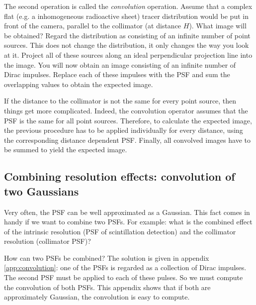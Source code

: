 \documentclass[11pt,oneside]{article}
\begin{document}
The second operation is called the {\em convolution} operation. Assume that a
complex flat (e.g. a inhomogeneous radioactive sheet) tracer distribution
would be put in front of the camera, parallel to the collimator (at distance
$H$). What image will be obtained?  Regard the distribution as consisting of
an infinite number of point sources. This does not change the distribution, it
only changes the way you look at it. Project all of these sources along an
ideal perpendicular projection line into the image. You will now obtain an
image consisting of an infinite number of Dirac impulses. Replace each of
these impulses with the PSF and sum the overlapping values to obtain the
expected image.

If the distance to the collimator is not the same for every point source, then
things get more complicated. Indeed, the convolution operator assumes that the
PSF is the same for all point sources. Therefore, to calculate the expected
image, the previous procedure has to be applied individually for every
distance, using the corresponding distance dependent PSF. Finally, all
convolved images have to be summed to yield the expected image.

\newpage
\subsection{Combining resolution effects: convolution of two Gaussians} \label{app:convol2gauss}
Very often, the PSF can be well approximated as a Gaussian. This fact comes in
handy if we want to combine two PSFs. For example: what is the combined effect
of the intrinsic resolution (PSF of scintillation detection) and the collimator
resolution (collimator PSF)?

How can two PSFs be combined? The solution is given in appendix
\ref{app:convolution}: one of the PSFs is regarded as a collection of Dirac
impulses. The second PSF must be applied to each of these pulses. So we must
compute the convolution of both PSFs. This appendix shows that if both are
approximately Gaussian, the convolution is easy to compute.
\end{document}
